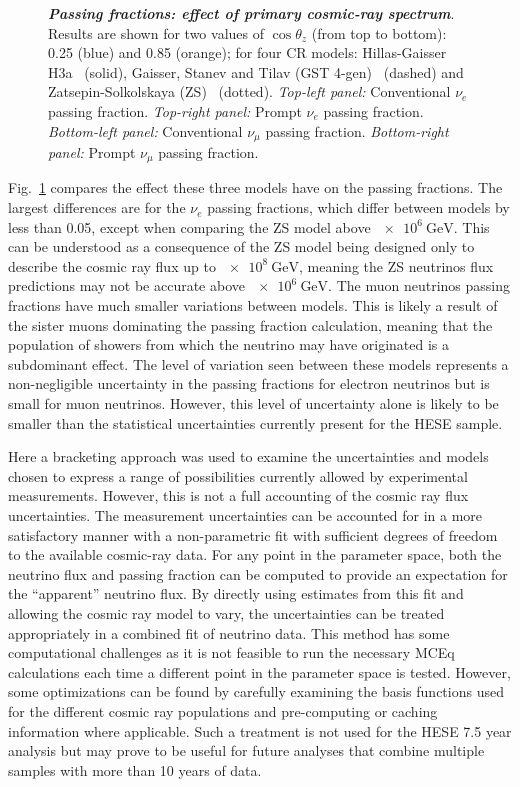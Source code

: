 \begin{figure}[h!]
{	}
	\caption{\textbf{\textit{Passing fractions: effect of primary cosmic-ray spectrum}}. Results are shown for two values of $\cos\theta_z$ (from top to bottom): 0.25 (blue) and 0.85 (orange); for four CR models: Hillas-Gaisser H3a~\cite{Gaisser:2011cc} (solid), Gaisser, Stanev and Tilav (GST 4-gen)~\cite{Gaisser:2013bla} (dashed) and Zatsepin-Solkolskaya (ZS)~\cite{Zatsepin:2006ci} (dotted).
		\textit{Top-left panel:} Conventional $\nu_e$ passing fraction. \textit{Top-right panel:} Prompt $\nu_e$ passing fraction. \textit{Bottom-left panel:} Conventional $\nu_\mu$ passing fraction. \textit{Bottom-right panel:} Prompt $\nu_\mu$ passing fraction.}
	\label{fig:nue-cr-model-effect} \vspace{1.5cm}
\end{figure}

Fig.~\ref{fig:nue-cr-model-effect} compares the effect these three models have on the passing fractions.
The largest differences are for the $\nu_e$ passing fractions, which differ between models by less than 0.05, except when comparing the ZS model above $\SI{e6}\GeV$.
This can be understood as a consequence of the ZS model being designed only to describe the cosmic ray flux up to $\SI{e8}\GeV$, meaning the ZS neutrinos flux predictions may not be accurate above $\SI{e6}\GeV$.
The muon neutrinos passing fractions have much smaller variations between models.
This is likely a result of the sister muons dominating the passing fraction calculation, meaning that the population of showers from which the neutrino may have originated is a subdominant effect.
The level of variation seen between these models represents a non-negligible uncertainty in the passing fractions for electron neutrinos but is small for muon neutrinos.
However, this level of uncertainty alone is likely to be smaller than the statistical uncertainties currently present for the HESE sample.

Here a bracketing approach was used to examine the uncertainties and models chosen to express a range of possibilities currently allowed by experimental measurements.
However, this is not a full accounting of the cosmic ray flux uncertainties.
The measurement uncertainties can be accounted for in a more satisfactory manner with a non-parametric fit with sufficient degrees of freedom to the available cosmic-ray data.
For any point in the parameter space, both the neutrino flux and passing fraction can be computed to provide an expectation for the ``apparent'' neutrino flux.
By directly using estimates from this fit and allowing the cosmic ray model to vary, the uncertainties can be treated appropriately in a combined fit of neutrino data.
This method has some computational challenges as it is not feasible to run the necessary MCEq calculations each time a different point in the parameter space is tested.
However, some optimizations can be found by carefully examining the basis functions used for the different cosmic ray populations and pre-computing or caching information where applicable.
Such a treatment is not used for the HESE 7.5 year analysis but may prove to be useful for future analyses that combine multiple samples with more than 10 years of data.

